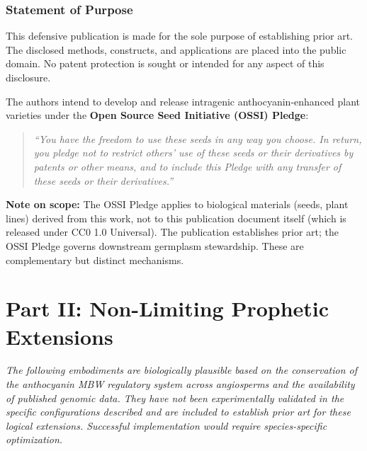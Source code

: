 \documentclass[12pt,a4paper]{article}
\begin{document}
\section{Statement of Purpose}

This defensive publication is made for the sole purpose of establishing prior art. The disclosed methods, constructs, and applications are placed into the public domain. No patent protection is sought or intended for any aspect of this disclosure.

The authors intend to develop and release intragenic anthocyanin-enhanced plant varieties under the \textbf{Open Source Seed Initiative (OSSI) Pledge}:
\begin{quote}
\textit{``You have the freedom to use these seeds in any way you choose. In return, you pledge not to restrict others' use of these seeds or their derivatives by patents or other means, and to include this Pledge with any transfer of these seeds or their derivatives.''}
\end{quote}

\noindent\textbf{Note on scope:} The OSSI Pledge applies to biological materials (seeds, plant lines) derived from this work, not to this publication document itself (which is released under CC0 1.0 Universal). The publication establishes prior art; the OSSI Pledge governs downstream germplasm stewardship. These are complementary but distinct mechanisms.

\newpage
\part*{Part II: Non-Limiting Prophetic Extensions}

\noindent\textit{The following embodiments are biologically plausible based on the conservation of the anthocyanin MBW regulatory system across angiosperms and the availability of published genomic data. They have not been experimentally validated in the specific configurations described and are included to establish prior art for these logical extensions. Successful implementation would require species-specific optimization.}

\end{document}
